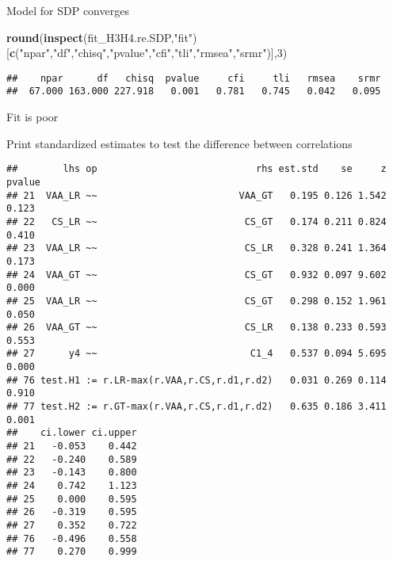 \documentclass[
]{article}
\newenvironment{Shaded}{\begin{snugshade}}{\end{snugshade}}
\newcommand{\DecValTok}[1]{\textcolor[rgb]{0.00,0.00,0.81}{#1}}
\newcommand{\KeywordTok}[1]{\textcolor[rgb]{0.13,0.29,0.53}{\textbf{#1}}}
\newcommand{\NormalTok}[1]{#1}
\newcommand{\OperatorTok}[1]{\textcolor[rgb]{0.81,0.36,0.00}{\textbf{#1}}}
\newcommand{\StringTok}[1]{\textcolor[rgb]{0.31,0.60,0.02}{#1}}
\begin{document}
Model for SDP converges

\begin{Shaded}
\begin{Highlighting}[]
\KeywordTok{round}\NormalTok{(}\KeywordTok{inspect}\NormalTok{(fit_H3H4.re.SDP,}\StringTok{"fit"}\NormalTok{)}
\NormalTok{      [}\KeywordTok{c}\NormalTok{(}\StringTok{"npar"}\NormalTok{,}\StringTok{"df"}\NormalTok{,}\StringTok{"chisq"}\NormalTok{,}\StringTok{"pvalue"}\NormalTok{,}\StringTok{"cfi"}\NormalTok{,}\StringTok{"tli"}\NormalTok{,}\StringTok{"rmsea"}\NormalTok{,}\StringTok{"srmr"}\NormalTok{)],}\DecValTok{3}\NormalTok{)}
\end{Highlighting}
\end{Shaded}

\begin{verbatim}
##    npar      df   chisq  pvalue     cfi     tli   rmsea    srmr 
##  67.000 163.000 227.918   0.001   0.781   0.745   0.042   0.095
\end{verbatim}

Fit is poor

Print standardized estimates to test the difference between correlations

\begin{Shaded}
\end{Shaded}

\begin{verbatim}
##        lhs op                            rhs est.std    se     z pvalue
## 21  VAA_LR ~~                         VAA_GT   0.195 0.126 1.542  0.123
## 22   CS_LR ~~                          CS_GT   0.174 0.211 0.824  0.410
## 23  VAA_LR ~~                          CS_LR   0.328 0.241 1.364  0.173
## 24  VAA_GT ~~                          CS_GT   0.932 0.097 9.602  0.000
## 25  VAA_LR ~~                          CS_GT   0.298 0.152 1.961  0.050
## 26  VAA_GT ~~                          CS_LR   0.138 0.233 0.593  0.553
## 27      y4 ~~                           C1_4   0.537 0.094 5.695  0.000
## 76 test.H1 := r.LR-max(r.VAA,r.CS,r.d1,r.d2)   0.031 0.269 0.114  0.910
## 77 test.H2 := r.GT-max(r.VAA,r.CS,r.d1,r.d2)   0.635 0.186 3.411  0.001
##    ci.lower ci.upper
## 21   -0.053    0.442
## 22   -0.240    0.589
## 23   -0.143    0.800
## 24    0.742    1.123
## 25    0.000    0.595
## 26   -0.319    0.595
## 27    0.352    0.722
## 76   -0.496    0.558
## 77    0.270    0.999
\end{verbatim}
\end{document}
